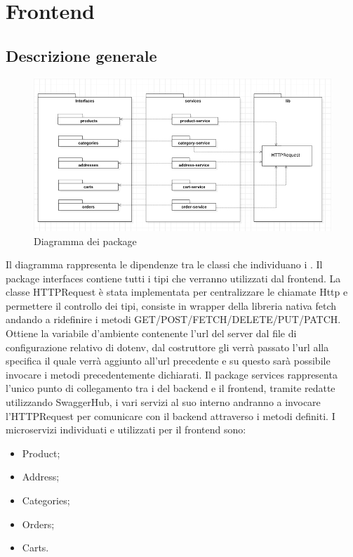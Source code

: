 \newpage
\section{Frontend}
\subsection{Descrizione generale}
\begin{figure}[H]
	\centering
	\includegraphics[scale=0.6]{Immagini/Frontend/DiagrammadeiPackage.png}
	\caption{Diagramma dei package}
	\label{fig:fe-packages}
\end{figure}
Il diagramma rappresenta le dipendenze tra le classi che individuano i . Il package interfaces contiene tutti i tipi che verranno utilizzati dal frontend. La classe HTTPRequest è stata implementata per centralizzare le chiamate Http e permettere il controllo dei tipi, consiste in wrapper della libreria nativa fetch andando a ridefinire i metodi GET/POST/FETCH/DELETE/PUT/PATCH. Ottiene la variabile d'ambiente contenente l'url del server dal file di configurazione relativo di dotenv, dal costruttore gli verrà passato l'url alla specifica  il quale verrà aggiunto all'url precedente e su questo sarà possibile invocare i metodi precedentemente dichiarati.
Il package services rappresenta l'unico punto di collegamento tra i  del backend e il frontend, tramite  redatte utilizzando SwaggerHub, i vari servizi al suo interno andranno a invocare l'HTTPRequest per comunicare con il backend attraverso i metodi definiti.
I microservizi individuati e utilizzati per il frontend sono:
\begin{itemize}
	\item Product;
	\item Address;
	\item Categories;
	\item Orders;
	\item Carts.
\end{itemize}
